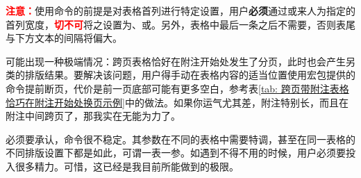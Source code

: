 \documentclass[doctor, vlined]{DissertUESTC}
\begin{document}
	\textcolor{red}{\textbf{注意：}}使用命令的前提是对表格首列进行特定设置，用户\textbf{必须}通过或来人为指定的首列宽度，\textcolor{red}{\textbf{切不可}}将之设置为、或。另外，表格中最后一条之后不需要\shadcmd{\shadcmd{}}，否则表尾与下方文本的间隔将偏大。

	可能出现一种极端情况：跨页表格恰好在附注开始处发生了分页，此时也会产生另类的排版结果。要解决该问题，用户得手动在表格内容的适当位置使用\href{https://mirrors.tuna.tsinghua.edu.cn/CTAN/macros/latex/required/tools/longtable.pdf}{\ttfamily\color{DarkRed}}宏包提供的命令提前断页，代价是前一页底部可能有更多空白，参考表\ref{tab: 跨页带附注表格恰巧在附注开始处换页示例}中的做法。如果你运气尤其差，附注特别长，而且在附注中间跨页了，那我实在无能为力了。

	必须要承认，命令很不稳定。其参数在不同的表格中需要特调，甚至在同一表格的不同排版设置下都是如此，可谓一表一参。如遇到不得不用的时候，用户必须要投入很多精力。可惜，这已经是我目前所能做到的极限。


	\newpage
\end{document}

